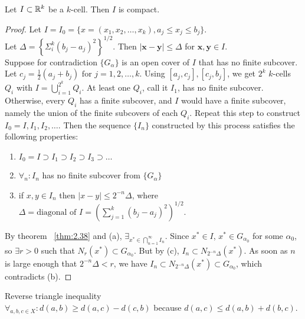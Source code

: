 \begin{theorem}
	\label{thm:2.39}
	Let $I \subset \mathbb{R} ^{k}$ be a $k$-cell. Then $I$ is compact.
	\begin{proof}
		Let $I=I_0=\{x=(x_1,x_2, \ldots ,x_k), a_j \le x_j \le b_j\}$.\\
		Let $\Delta=\left\{\Sigma_{i}^{k}(b_j - a_j)^{2}  \right\}^{1/2}$. Then $|\mathbf{x}-\mathbf{y}|\le \Delta$ for $\mathbf{x,y} \in I$.\\
		Suppose for contradiction $\{G_{\alpha}\}$ is an open cover of $I$ that has no finite subcover.\\
		Let $c_j=\frac{1}{2}(a_j + b_j) \text{ for }  j=1,2, \ldots ,k$.
		Using $[a_j,c_j], [c_j,b_j]$, we get $2^{k}$ $k$-cells $Q_i$ with $I=\bigcup_{i=1}^{2^{k}}Q_i$.
		At least one $Q_i$, call it $I_1$, has no finite subcover. Otherwise, every $Q_i$ has a finite subcover, and $I$ would have a finite subcover, namely the union of the finite subcovers of each $Q_i$.
		Repeat this step to construct $I_0=I,I_1,I_2, \ldots $.
		Then the sequence $\{I_n\}$ constructed by this process satisfies the following properties:
		\begin{enumerate}
			\item $I_0=I \supset I_1 \supset I_2 \supset I_3 \supset \ldots $
			\item $\forall_{n}: I_n$ has no finite subcover from $\{G_{\alpha}\}$
			\item if $x,y \in I_n$ then $|x-y|\le  2^{-n}\Delta$, where $\Delta= \text{diagonal of }I=\left( \sum_{j=1}^{k}{(b_j-a_j)^2} \right)^{1/2}$.
		\end{enumerate}
		By theorem ~\ref{thm:2.38} and (a), $\exists_{x^{*} \in \bigcap_{n=1}^{\infty}I_n }$.
		Since $x^{*} \in  I$, $x^{*} \in G_{\alpha_0}$ for some $\alpha_0$, so $\exists r>0$ such that $N_r(x^{*}) \subset G_{\alpha_0}$. But by (c), $I_n \subset N_{2^{-n}\Delta}(x^{*})$. As soon as $n$ is large enough that $2^{-n} \Delta <r$, we have $I_n \subset N_{2^{-n}\Delta}(x^{*}) \subset G_{\alpha_0}$, which contradicts (b).
	\end{proof}
\end{theorem}

\begin{note}
	Reverse triangle inequality\\
	$\forall_{a,b,c \in X}: d(a,b)\ge d(a,c)-d(c,b)$ because $d(a,c)\le d(a,b)+d(b,c)$.
\end{note}

